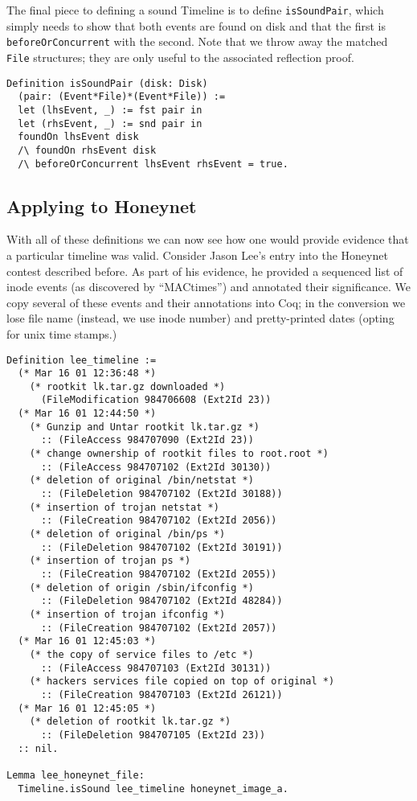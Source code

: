 \documentclass[nocopyrightspace]{sigplanconf}
\begin{document}
The final piece to defining a sound Timeline is to define {\tt isSoundPair},
which simply needs to show that both events are found on disk and that the
first is {\tt beforeOrConcurrent} with the second. Note that we throw away the
matched {\tt File} structures; they are only useful to the associated
reflection proof.

\begin{lstlisting}
Definition isSoundPair (disk: Disk) 
  (pair: (Event*File)*(Event*File)) :=
  let (lhsEvent, _) := fst pair in
  let (rhsEvent, _) := snd pair in
  foundOn lhsEvent disk
  /\ foundOn rhsEvent disk
  /\ beforeOrConcurrent lhsEvent rhsEvent = true.
\end{lstlisting}


\subsection{Applying to Honeynet}
With all of these definitions we can now see how one would provide evidence
that a particular timeline was valid. Consider Jason Lee's entry\cite{lee}
into the Honeynet contest described before. As part of his evidence, he
provided a sequenced list of inode events (as discovered by ``MACtimes'') and
annotated their significance. We copy several of these events and their
annotations into Coq; in the conversion we lose file name (instead, we use
inode number) and pretty-printed dates (opting for unix time stamps.)

\begin{lstlisting}
Definition lee_timeline :=
  (* Mar 16 01 12:36:48 *)
    (* rootkit lk.tar.gz downloaded *)
      (FileModification 984706608 (Ext2Id 23))
  (* Mar 16 01 12:44:50 *)
    (* Gunzip and Untar rootkit lk.tar.gz *)
      :: (FileAccess 984707090 (Ext2Id 23))
    (* change ownership of rootkit files to root.root *)
      :: (FileAccess 984707102 (Ext2Id 30130))
    (* deletion of original /bin/netstat *)
      :: (FileDeletion 984707102 (Ext2Id 30188))
    (* insertion of trojan netstat *)
      :: (FileCreation 984707102 (Ext2Id 2056))
    (* deletion of original /bin/ps *)
      :: (FileDeletion 984707102 (Ext2Id 30191))
    (* insertion of trojan ps *)
      :: (FileCreation 984707102 (Ext2Id 2055))
    (* deletion of origin /sbin/ifconfig *)
      :: (FileDeletion 984707102 (Ext2Id 48284))
    (* insertion of trojan ifconfig *)
      :: (FileCreation 984707102 (Ext2Id 2057))
  (* Mar 16 01 12:45:03 *)
    (* the copy of service files to /etc *)
      :: (FileAccess 984707103 (Ext2Id 30131))
    (* hackers services file copied on top of original *)
      :: (FileCreation 984707103 (Ext2Id 26121))
  (* Mar 16 01 12:45:05 *)
    (* deletion of rootkit lk.tar.gz *)
      :: (FileDeletion 984707105 (Ext2Id 23))
  :: nil.

Lemma lee_honeynet_file:
  Timeline.isSound lee_timeline honeynet_image_a.
\end{lstlisting}
\end{document}
